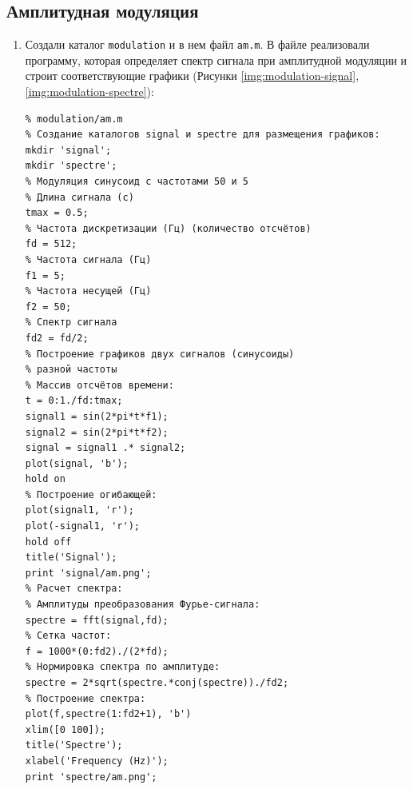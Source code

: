 \subsection{Амплитудная модуляция}
\begin{enumerate}
    \item Создали каталог \texttt{modulation} и в нем файл \texttt{am.m}.
        В файле реализовали программу, которая определяет спектр сигнала при
        амплитудной модуляции и строит соответствующие графики
        (Рисунки \ref{img:modulation-signal}, \ref{img:modulation-spectre}):

        \begin{verbatim}
% modulation/am.m
% Создание каталогов signal и spectre для размещения графиков:
mkdir 'signal';
mkdir 'spectre';
% Модуляция синусоид с частотами 50 и 5
% Длина сигнала (с)
tmax = 0.5;
% Частота дискретизации (Гц) (количество отсчётов)
fd = 512;
% Частота сигнала (Гц)
f1 = 5;
% Частота несущей (Гц)
f2 = 50;
% Спектр сигнала
fd2 = fd/2;
% Построение графиков двух сигналов (синусоиды)
% разной частоты
% Массив отсчётов времени:
t = 0:1./fd:tmax;
signal1 = sin(2*pi*t*f1);
signal2 = sin(2*pi*t*f2);
signal = signal1 .* signal2;
plot(signal, 'b');
hold on
% Построение огибающей:
plot(signal1, 'r');
plot(-signal1, 'r');
hold off
title('Signal');
print 'signal/am.png';
% Расчет спектра:
% Амплитуды преобразования Фурье-сигнала:
spectre = fft(signal,fd);
% Сетка частот:
f = 1000*(0:fd2)./(2*fd);
% Нормировка спектра по амплитуде:
spectre = 2*sqrt(spectre.*conj(spectre))./fd2;
% Построение спектра:
plot(f,spectre(1:fd2+1), 'b')
xlim([0 100]);
title('Spectre');
xlabel('Frequency (Hz)');
print 'spectre/am.png';
        \end{verbatim}


\end{enumerate}
